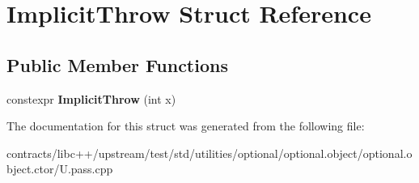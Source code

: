 \hypertarget{struct_implicit_throw}{}\section{Implicit\+Throw Struct Reference}
\label{struct_implicit_throw}
\subsection*{Public Member Functions}
\begin{DoxyCompactItemize}
\item 
\mbox{\label{struct_implicit_throw_a2ca93fda3b89f4698ac4b7dd35537d4c}} 
constexpr {\bfseries Implicit\+Throw} (int x)
\end{DoxyCompactItemize}


The documentation for this struct was generated from the following file\+:\begin{DoxyCompactItemize}
\item 
contracts/libc++/upstream/test/std/utilities/optional/optional.\+object/optional.\+object.\+ctor/U.\+pass.\+cpp\end{DoxyCompactItemize}
